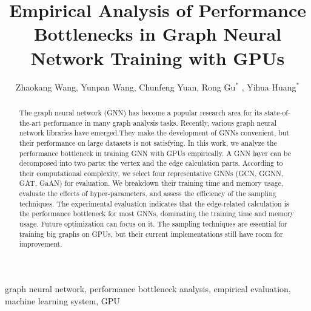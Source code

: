 \documentclass{elsarticle}
\begin{document}
\begin{frontmatter}

	\title{Empirical Analysis of Performance Bottlenecks in Graph Neural Network Training with GPUs}
    \author{Zhaokang Wang, Yunpan Wang, Chunfeng Yuan, Rong Gu$^*$ , Yihua Huang$^*$ }
	\address{State Key Laboratory for Novel Software Technology, \\Department of Computer Science and Technology, Nanjing University, \\Nanjing 210023, China}

	\begin{abstract}
		The graph neural network (GNN) has become a popular research area for its state-of-the-art performance in many graph analysis tasks. 
		Recently, various graph neural network libraries have emerged.They make the development of GNNs convenient, but their performance on large datasets is not satisfying. 
		In this work, we analyze the performance bottleneck in training GNN with GPUs empirically. 
		A GNN layer can be decomposed into two parts: the vertex and the edge calculation parts. 
		According to their computational complexity, we select four representative GNNs (GCN, GGNN, GAT, GaAN) for evaluation. 
		We breakdown their training time and memory usage, evaluate the effects of hyper-parameters, and assess the efficiency of the sampling techniques.
		The experimental evaluation indicates that the edge-related calculation is the performance bottleneck for most GNNs, dominating the training time and memory usage.
		Future optimization can focus on it. The sampling techniques are essential for training big graphs on GPUs, but their current implementations still have room for improvement.
	\end{abstract}

	\begin{keyword}
		graph neural network, performance bottleneck analysis, empirical evaluation, machine learning system, GPU
	\end{keyword}

\end{frontmatter}

\linenumbers









\nocite{*}%

\end{document}
